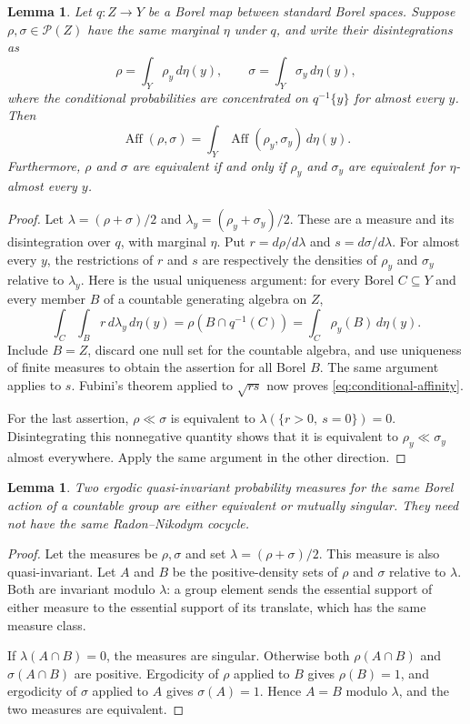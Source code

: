 \documentclass[11pt]{article}
\numberwithin{equation}{section}
\newtheorem{lemma}[theorem]{Lemma}
\theoremstyle{definition}
\newcommand{\Prob}{\mathcal P}
\newcommand{\Aff}{\operatorname{Aff}}
\begin{document}
\begin{lemma}\label{lem:affinity-disintegration}
Let $q:Z\to Y$ be a Borel map between standard Borel spaces. Suppose
$\rho,\sigma\in\Prob(Z)$ have the same marginal $\eta$ under $q$, and
write their disintegrations as
\[
 \rho=\int_Y\rho_y\,d\eta(y),\qquad
 \sigma=\int_Y\sigma_y\,d\eta(y),
\]
where the conditional probabilities are concentrated on $q^{-1}\{y\}$
for almost every $y$. Then
\begin{equation}\label{eq:conditional-affinity}
 \Aff(\rho,\sigma)
   =\int_Y\Aff(\rho_y,\sigma_y)\,d\eta(y).
\end{equation}
Furthermore, $\rho$ and $\sigma$ are equivalent if and only if
$\rho_y$ and $\sigma_y$ are equivalent for $\eta$-almost every $y$.
\end{lemma}

\begin{proof}
Let $\lambda=(\rho+\sigma)/2$ and
$\lambda_y=(\rho_y+\sigma_y)/2$. These are a measure and its
disintegration over $q$, with marginal $\eta$. Put
$r=d\rho/d\lambda$ and $s=d\sigma/d\lambda$.
For almost every $y$, the restrictions of $r$ and $s$ are respectively
the densities of $\rho_y$ and $\sigma_y$ relative to $\lambda_y$.
Here is the usual uniqueness argument: for every Borel $C\subseteq Y$
and every member $B$ of a countable generating algebra on $Z$,
\[
 \int_C\int_B r\,d\lambda_y\,d\eta(y)
 =\rho(B\cap q^{-1}(C))
 =\int_C\rho_y(B)\,d\eta(y).
\]
Include $B=Z$, discard one null set for the countable algebra, and
use uniqueness of finite measures to obtain the assertion for all
Borel $B$. The same argument applies to $s$.
Fubini's theorem applied to $\sqrt{rs}$ now proves
\eqref{eq:conditional-affinity}.

For the last assertion, $\rho\ll\sigma$ is equivalent to
$\lambda(\{r>0,\ s=0\})=0$. Disintegrating this nonnegative quantity
shows that it is equivalent to $\rho_y\ll\sigma_y$ almost everywhere.
Apply the same argument in the other direction.
\end{proof}

\begin{lemma}\label{lem:ergodic-dichotomy}
Two ergodic quasi-invariant probability measures for the same Borel
action of a countable group are either equivalent or mutually singular.
They need not have the same Radon--Nikodym cocycle.
\end{lemma}

\begin{proof}
Let the measures be $\rho,\sigma$ and set
$\lambda=(\rho+\sigma)/2$. This measure is also quasi-invariant.
Let $A$ and $B$ be the positive-density sets of $\rho$ and $\sigma$
relative to $\lambda$. Both are invariant modulo $\lambda$: a group
element sends the essential support of either measure to the
essential support of its translate, which has the same measure class.

If $\lambda(A\cap B)=0$, the measures are singular. Otherwise both
$\rho(A\cap B)$ and $\sigma(A\cap B)$ are positive. Ergodicity of
$\rho$ applied to $B$ gives $\rho(B)=1$, and ergodicity of $\sigma$
applied to $A$ gives $\sigma(A)=1$. Hence $A=B$ modulo $\lambda$,
and the two measures are equivalent.
\end{proof}
\end{document}

